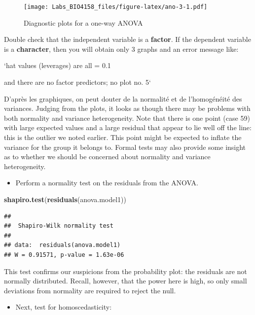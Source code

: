 \documentclass[
  12pt,
]{book}
\makeatletter
\newenvironment{Shaded}{\begin{snugshade}}{\end{snugshade}}
\newcommand{\KeywordTok}[1]{\textcolor[rgb]{0.13,0.29,0.53}{\textbf{#1}}}
\newcommand{\NormalTok}[1]{#1}
\providecommand{\tightlist}{%
  \setlength{\itemsep}{0pt}\setlength{\parskip}{0pt}}
\newenvironment{kframe}{%
\medskip{}
\setlength{\fboxsep}{.8em}
\def\at@end@of@kframe{}%
\ifinner\ifhmode%
 \def\at@end@of@kframe{\end{minipage}}%
 \begin{minipage}{\columnwidth}%
\fi\fi%
\def\FrameCommand##1{\hskip\@totalleftmargin \hskip-\fboxsep
\colorbox{incolor}{##1}\hskip-\fboxsep
    \hskip-\linewidth \hskip-\@totalleftmargin \hskip\columnwidth}%
\MakeFramed {\advance\hsize-\width
  \@totalleftmargin\z@ \linewidth\hsize
  \@setminipage}}%
{\par\unskip\endMakeFramed%
\at@end@of@kframe}
\newenvironment{rmdblock}[1]
 {
 \begin{itemize}
 \renewcommand{\labelitemi}{
   \raisebox{-.7\height}[0pt][0pt]{
     {\setkeys{Gin}{width=3em,keepaspectratio}\texttt{[image: images/\#1]}}
   }
 }
 \begin{kframe}
 \setlength{\fboxsep}{1em}
 \item
 }
 {
 \end{kframe}
 \end{itemize}
 }
\newenvironment{rmdwarning}
  {\begin{rmdblock}{warning}}
  {\end{rmdblock}}
\makeatother
\begin{document}
\begin{figure}
\centering
\texttt{[image: Labs\_BIO4158\_files/figure-latex/ano-3-1.pdf]}
\caption{\label{fig:ano-3}Diagnostic plots for a one-way ANOVA}
\end{figure}

\begin{rmdwarning}
Double check that the independent variable is a \textbf{factor}. If the dependent variable is a \textbf{character}, then you will obtain only 3 graphs and an error message like:

`hat values (leverages) are all = 0.1

and there are no factor predictors; no plot no. 5`
\end{rmdwarning}

D'après les graphiques, on peut douter de la normalité et de l'homogénéité des variances. Judging from the plots, it looks as though there may be problems with both normality and variance heterogeneity. Note that there is one point (case 59) with large expected values and a large residual that appear to lie well off the line: this is the outlier we noted earlier. This point might be expected to inflate the variance for the group it belongs to. Formal tests may also provide some insight as to whether we should be concerned about normality and variance heterogeneity.

\begin{itemize}
\tightlist
\item
  Perform a normality test on the residuals from the ANOVA.
\end{itemize}

\begin{Shaded}
\begin{Highlighting}[]
\KeywordTok{shapiro.test}\NormalTok{(}\KeywordTok{residuals}\NormalTok{(anova.model1))}
\end{Highlighting}
\end{Shaded}

\begin{verbatim}
## 
##  Shapiro-Wilk normality test
## 
## data:  residuals(anova.model1)
## W = 0.91571, p-value = 1.63e-06
\end{verbatim}

This test confirms our suspicions from the probability plot: the residuals are not normally distributed. Recall, however, that the power here is high, so only small deviations from normality are required to reject the null.

\begin{itemize}
\tightlist
\item
  Next, test for homoscedasticity:
\end{itemize}
\end{document}
